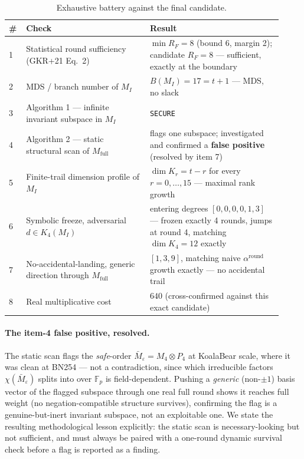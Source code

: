 \documentclass[11pt]{article}
\newcommand{\Fp}{\mathbb{F}_p}
\newcommand{\MI}{M_{I}}
\newcommand{\Mfull}{M_{\mathrm{full}}}
\begin{document}
\begin{table}[h!]
\centering
\caption{Exhaustive battery against the final candidate.}
\label{tab:battery}
\small
\begin{tabular}{@{}p{0.05\linewidth}p{0.42\linewidth}p{0.45\linewidth}@{}}
\toprule
\# & Check & Result \\
\midrule
1 & Statistical round sufficiency (GKR+21 Eq.~2) & $\min R_F = 8$ (bound 6, margin 2); candidate $R_F=8$ --- sufficient, exactly at the boundary \\
2 & MDS / branch number of $\MI$ & $B(\MI)=17=t+1$ --- MDS, no slack \\
3 & Algorithm 1 --- infinite invariant subspace in $\MI$ & \texttt{SECURE} \\
4 & Algorithm 2 --- static structural scan of $\Mfull$ & flags one subspace; investigated and confirmed a \textbf{false positive} (resolved by item 7) \\
5 & Finite-trail dimension profile of $\MI$ & $\dim K_r = t-r$ for every $r=0,\dots,15$ --- maximal rank growth \\
6 & Symbolic freeze, adversarial $d\in K_4(\MI)$ & entering degrees $[0,0,0,0,1,3]$ --- frozen exactly 4 rounds, jumps at round 4, matching $\dim K_4=12$ exactly \\
7 & No-accidental-landing, generic direction through $\Mfull$ & $[1,3,9]$, matching naive $\alpha^{\text{round}}$ growth exactly --- no accidental trail \\
8 & Real multiplicative cost & $640$ (cross-confirmed against this exact candidate) \\
\bottomrule
\end{tabular}
\end{table}

\paragraph{The item-4 false positive, resolved.} The static scan flags
the \emph{safe}-order $\bar M_\varepsilon = M_4\otimes P_4$ at KoalaBear
scale, where it was clean at BN254 --- not a contradiction, since which
irreducible factors $\chi(\bar M_\varepsilon)$ splits into over $\Fp$ is
field-dependent. Pushing a \emph{generic} (non-$\pm1$) basis vector of the
flagged subspace through one real full round shows it reaches full weight
(no negation-compatible structure survives), confirming the flag is a
genuine-but-inert invariant subspace, not an exploitable one. We state
the resulting methodological lesson explicitly: the static scan is
necessary-looking but not sufficient, and must always be paired with a
one-round dynamic survival check before a flag is reported as a finding.
\end{document}
